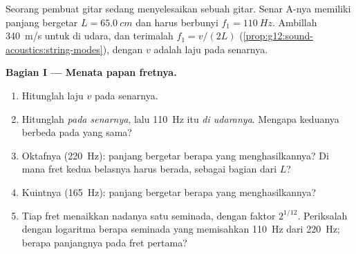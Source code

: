 \begin{problem}
\label{pb:g12:sound-acoustics:1}
Seorang pembuat gitar sedang menyelesaikan sebuah gitar. Senar A-nya
memiliki panjang bergetar $L = \qty{65.0}{cm}$ dan harus berbunyi
$f_1 = \qty{110}{Hz}$. Ambillah \qty{340}{m/s} untuk  di udara, dan
terimalah $f_1 = v/(2L)$
(\cref{prop:g12:sound-acoustics:string-modes}), dengan $v$ adalah laju
 pada senarnya.

\medskip
\noindent\textbf{Bagian I --- Menata papan fretnya.}
\begin{enumerate}
  \item Hitunglah laju  $v$ pada senarnya.
  \item Hitunglah   \emph{pada senarnya},
        lalu   \qty{110}{Hz} itu \emph{di
        udaranya}. Mengapa keduanya berbeda pada  yang sama?
  \item Oktafnya (\qty{220}{Hz}): panjang bergetar berapa yang
        menghasilkannya? Di mana fret kedua belasnya harus berada,
        sebagai bagian dari $L$?
  \item Kuintnya (\qty{165}{Hz}): panjang bergetar berapa yang
        menghasilkannya?
  \item Tiap fret menaikkan nadanya satu seminada, dengan faktor
        $2^{1/12}$. Periksalah dengan logaritma berapa seminada yang
        memisahkan \qty{110}{Hz} dari \qty{220}{Hz}; berapa panjangnya
        pada fret pertama?
\end{enumerate}


\end{problem}
